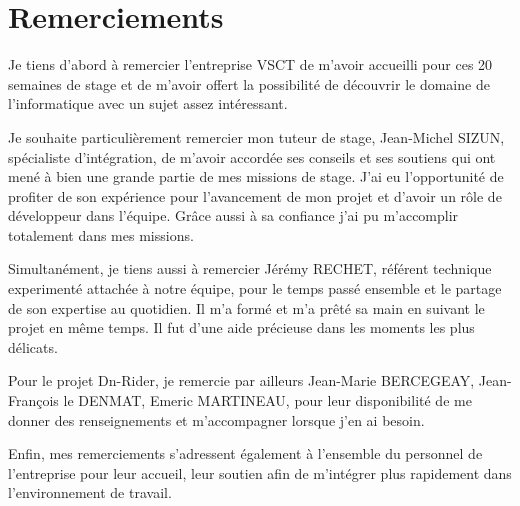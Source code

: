 \chapter*{Remerciements}

Je tiens d’abord à remercier l’entreprise VSCT de m’avoir accueilli pour ces 20 semaines de stage
et de m’avoir offert la possibilité de découvrir le domaine de l'informatique avec un sujet assez intéressant.

Je souhaite particulièrement remercier mon tuteur de stage, Jean-Michel SIZUN, spécialiste d'intégration,
de m’avoir accordée ses conseils et ses soutiens qui ont mené à bien une grande partie de mes missions de stage.
J’ai eu l’opportunité de profiter de son expérience pour l’avancement de mon projet et d'avoir un rôle de développeur dans l'équipe.
Grâce aussi à sa confiance j'ai pu m'accomplir totalement dans mes missions.

Simultanément, je tiens aussi à remercier Jérémy RECHET, référent technique experimenté attachée à notre équipe,
pour le temps passé ensemble et le partage de son expertise au quotidien.
Il m’a formé et m’a prêté sa main en suivant le projet en même temps.
Il fut d'une aide précieuse dans les moments les plus délicats.

Pour le projet Dn-Rider, je remercie par ailleurs Jean-Marie BERCEGEAY, Jean-François le DENMAT, Emeric MARTINEAU, pour leur disponibilité de me donner des
renseignements et m’accompagner lorsque j'en ai besoin.

Enfin, mes remerciements s’adressent également à l’ensemble du personnel de l’entreprise
pour leur accueil, leur soutien afin de m’intégrer plus rapidement dans l’environnement de travail.
